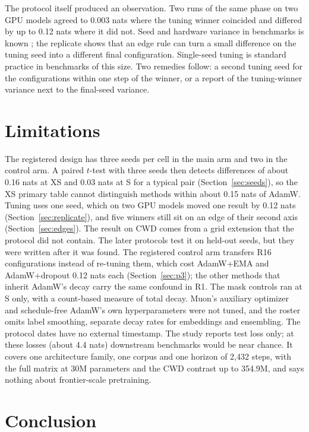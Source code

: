 \documentclass[twoside,11pt]{article}
\begin{document}
The protocol itself produced an observation. Two runs of the same phase on two GPU models agreed to 0.003 nats where the tuning winner coincided and differed by up to 0.12 nats where it did not. Seed and hardware variance in benchmarks is known \citep{bouthillier2021accounting,picard2021torch}; the replicate shows that an edge rule can turn a small difference on the tuning seed into a different final configuration. Single-seed tuning is standard practice in benchmarks of this size. Two remedies follow: a second tuning seed for the configurations within one step of the winner, or a report of the tuning-winner variance next to the final-seed variance.

\section{Limitations}
\label{sec:limitations}

The registered design has three seeds per cell in the main arm and two in the control arm. A paired $t$-test with three seeds then detects differences of about 0.16 nats at XS and 0.03 nats at S for a typical pair (Section~\ref{sec:seeds}), so the XS primary table cannot distinguish methods within about 0.15 nats of AdamW. Tuning uses one seed, which on two GPU models moved one result by 0.12 nats (Section~\ref{sec:replicate}), and five winners still sit on an edge of their second axis (Section~\ref{sec:edges}). The result on CWD comes from a grid extension that the protocol did not contain. The later protocols test it on held-out seeds, but they were written after it was found. The registered control arm transfers R16 configurations instead of re-tuning them, which cost AdamW+EMA and AdamW+dropout 0.12 nats each (Section~\ref{sec:p3}); the other methods that inherit AdamW's decay carry the same confound in R1. The mask controls ran at S only, with a count-based measure of total decay. Muon's auxiliary optimizer and schedule-free AdamW's own hyperparameters were not tuned, and the roster omits label smoothing, separate decay rates for embeddings and ensembling. The protocol dates have no external timestamp. The study reports test loss only; at these losses (about 4.4 nats) downstream benchmarks would be near chance. It covers one architecture family, one corpus and one horizon of 2,432 steps, with the full matrix at 30M parameters and the CWD contrast up to 354.9M, and says nothing about frontier-scale pretraining.

\section{Conclusion}
\label{sec:conclusion}
\end{document}
